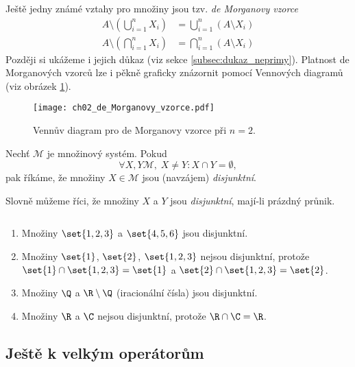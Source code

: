 Ještě jedny známé vztahy pro množiny jsou tzv. \emph{de Morganovy vzorce}
\begin{align*}
    A \setminus \left(\bigcup\limits_{i=1}^{n}{X_i}\right)&=\bigcup\limits_{i=1}^{n}{(A \setminus X_i)}\\
    A \setminus \left(\bigcap\limits_{i=1}^{n}{X_i}\right)&=\bigcap\limits_{i=1}^{n}{(A \setminus X_i)}
\end{align*}
Později si ukážeme i jejich důkaz (viz sekce \ref{subsec:dukaz_neprimy}). Platnost de Morganových vzorců lze i pěkně graficky znázornit pomocí Vennových diagramů (viz obrázek \ref{fig:vennuv_diagram_de_morgan}).
\begin{figure}[H]
	\centering
	\texttt{[image: ch02\_de\_Morganovy\_vzorce.pdf]}
    \caption{Vennův diagram pro de Morganovy vzorce při $n=2$.}
    \label{fig:vennuv_diagram_de_morgan}
\end{figure}

\begin{definition}
    Nechť $\mathcal{M}$ je množinový systém. Pokud
    \begin{equation*}
        \forall X,Y\mathcal{M},\;X\neq Y: X \cap Y=\emptyset,
    \end{equation*}
    pak říkáme, že množiny $X\in\mathcal{M}$ jsou (navzájem) \emph{disjunktní}.
\end{definition}
Slovně můžeme říci, že množiny $X$ a $Y$ jsou \emph{disjunktní}, mají-li prázdný průnik.
\begin{example}
    $ $
    \begin{enumerate}[label=(\roman*)]
        \item Množiny $\set{1,2,3}$ a $\set{4,5,6}$ jsou disjunktní.
        \item Množiny $\set{1}$, $\set{2}$, $\set{1,2,3}$ nejsou disjunktní, protože $\set{1}\cap\set{1,2,3}=\set{1}$ a $\set{2}\cap\set{1,2,3}=\set{2}$.
        \item Množiny $\Q$ a $\R\setminus\Q$ (iracionální čísla) jsou disjunktní.
        \item Množiny $\R$ a $\C$ nejsou disjunktní, protože $\R\cap\C=\R$.
    \end{enumerate}
\end{example}

\subsection{Ještě k velkým operátorům}\label{subsec:dodatek_velke_operatory}

